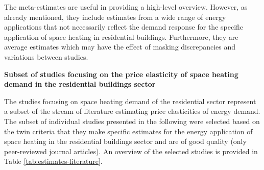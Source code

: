 \documentclass[12pt,twoside]{reedthesis}
\begin{document}
The meta-estimates are useful in providing a high-level overview. However, as already mentioned, they include estimates from a wide range of energy applications that not necessarily reflect the demand response for the specific application of space heating in residential buildings. Furthermore, they are average estimates which may have the effect of masking discrepancies and variations between studies.

\textbf{Subset of studies focusing on the price elasticity of space heating demand in the residential buildings sector}

The studies focusing on space heating demand of the residential sector represent a subset of the stream of literature estimating price elasticities of energy demand. The subset of individual studies presented in the following were selected based on the twin criteria that they make specific estimates for the energy application of space heating in the residential buildings sector and are of good quality (only peer-reviewed journal articles). An overview of the selected studies is provided in Table \ref{tab:estimates-literature}.
\end{document}

